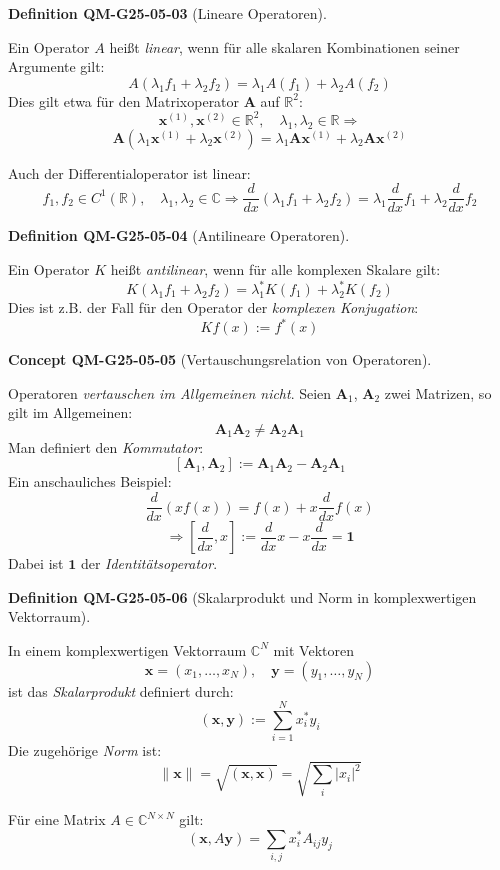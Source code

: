 \documentclass[10pt, letterpaper]{article}
\newcommand{\CustomHeading}[3]{%
  \par\medskip\noindent%
  \textbf{#1 #2} \textnormal{(#3)}.\enskip%
}
\newenvironment{DEF}[2]{\CustomHeading{Definition}{#1}{#2}}{}
\newenvironment{CONC}[2]{\CustomHeading{Concept}{#1}{#2}}{}
\begin{document}
\begin{DEF}{QM-G25-05-03}{Lineare Operatoren}
Ein Operator $A$ heißt \emph{linear}, wenn für alle skalaren Kombinationen seiner Argumente gilt:
\[
A(\lambda_1 f_1 + \lambda_2 f_2) = \lambda_1 A(f_1) + \lambda_2 A(f_2)
\]
Dies gilt etwa für den Matrixoperator $\mathbf{A}$ auf $\mathbb{R}^2$:
\[
\mathbf{x}^{(1)}, \mathbf{x}^{(2)} \in \mathbb{R}^{2}, \quad \lambda_1, \lambda_2 \in \mathbb{R} \Rightarrow
\]
\[
\mathbf{A}(\lambda_1 \mathbf{x}^{(1)} + \lambda_2 \mathbf{x}^{(2)}) = \lambda_1 \mathbf{A} \mathbf{x}^{(1)} + \lambda_2 \mathbf{A} \mathbf{x}^{(2)}
\]

Auch der Differentialoperator ist linear:
\[
f_1, f_2 \in C^1(\mathbb{R}), \quad \lambda_1, \lambda_2 \in \mathbb{C}
\Rightarrow
\frac{d}{dx}(\lambda_1 f_1 + \lambda_2 f_2)
= \lambda_1 \frac{d}{dx} f_1 + \lambda_2 \frac{d}{dx} f_2
\]
\end{DEF}

\begin{DEF}{QM-G25-05-04}{Antilineare Operatoren}
Ein Operator $K$ heißt \emph{antilinear}, wenn für alle komplexen Skalare gilt:
\[
K(\lambda_1 f_1 + \lambda_2 f_2) = \lambda_1^* K(f_1) + \lambda_2^* K(f_2)
\]
Dies ist z.B. der Fall für den Operator der \emph{komplexen Konjugation}:
\[
K f(x) := f^*(x)
\]
\end{DEF}

\begin{CONC}{QM-G25-05-05}{Vertauschungsrelation von Operatoren}
Operatoren \emph{vertauschen im Allgemeinen nicht}. Seien $\mathbf{A}_1$, $\mathbf{A}_2$ zwei Matrizen, so gilt im Allgemeinen:
\[
\mathbf{A}_1 \mathbf{A}_2 \neq \mathbf{A}_2 \mathbf{A}_1
\]
Man definiert den \emph{Kommutator}:
\[
[\mathbf{A}_1, \mathbf{A}_2] := \mathbf{A}_1 \mathbf{A}_2 - \mathbf{A}_2 \mathbf{A}_1
\]
Ein anschauliches Beispiel:
\[
\frac{d}{dx}(x f(x)) = f(x) + x \frac{d}{dx} f(x)
\]
\[
\Rightarrow \left[ \frac{d}{dx}, x \right] := \frac{d}{dx} x - x \frac{d}{dx} = \mathbf{1}
\]
Dabei ist $\mathbf{1}$ der \emph{Identitätsoperator}.
\end{CONC}

\begin{DEF}{QM-G25-05-06}{Skalarprodukt und Norm in komplexwertigen Vektorraum}
In einem komplexwertigen Vektorraum $\mathbb{C}^N$ mit Vektoren
\[
\mathbf{x} = (x_1, \dots, x_N), \quad \mathbf{y} = (y_1, \dots, y_N)
\]
ist das \emph{Skalarprodukt} definiert durch:
\[
(\mathbf{x}, \mathbf{y}) := \sum_{i=1}^N x_i^* y_i
\]
Die zugehörige \emph{Norm} ist:
\[
\|\mathbf{x}\| = \sqrt{(\mathbf{x}, \mathbf{x})} = \sqrt{\sum_i |x_i|^2}
\]

Für eine Matrix $A \in \mathbb{C}^{N \times N}$ gilt:
\[
(\mathbf{x}, A \mathbf{y}) = \sum_{i,j} x_i^* A_{ij} y_j
\]
\end{DEF}
\end{document}
